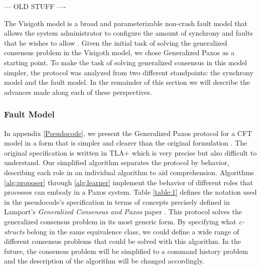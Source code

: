 {\color{red}--- OLD STUFF ----}\par
The Visigoth model is a broad and parameterizable non-crash fault model that allows the system administrator to configure the amount of synchrony and faults that he wishes to allow \cite{Porto2015}. Given the initial task of solving the generalized consensus problem in the Visigoth model, we chose Generalized Paxos as a starting point. To make the task of solving generalized consensus in this model simpler, the protocol was analyzed from two different standpoints: the synchrony model and the fault model. In the remainder of this section we will describe the advances made along each of these perspectives.  \par

\subsubsection{Fault Model} \label{Fault Model}
In appendix \ref{Pseudocode}, we present the Generalized Paxos protocol for a CFT model in a form that is simpler and clearer than the original formulation \cite{Lamport2005}. The original specification is written in TLA+ which is very precise but also difficult to understand. Our simplified algorithm separates the protocol by behavior, describing each role in an individual algorithm to aid comprehension. Algorithms \ref{alg:proposer} through \ref{alg:learner} implement the behavior of different roles that processes can embody in a Paxos system. Table \ref{table:1} defines the notation used in the pseudocode's specification in terms of concepts precisely defined in Lamport's \textit{Generalized Consensus and Paxos} paper \cite{Lamport2005}. This protocol solves the generalized consensus problem in its most generic form. By specifying what \textit{c-structs} belong in the same equivalence class, we could define a wide range of different consensus problems that could be solved with this algorithm. In the future, the consensus problem will be simplified to a command history problem and the description of the algorithm will be changed accordingly. \par 
